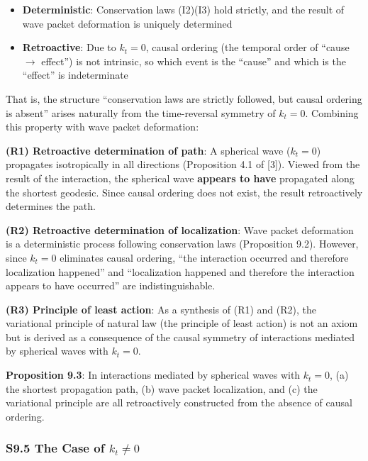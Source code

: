 \documentclass[
  a4paper,11pt]{article}
\providecommand{\tightlist}{%
  \setlength{\itemsep}{0pt}\setlength{\parskip}{0pt}}
\theoremstyle{definition}
\theoremstyle{remark}
\begin{document}
\begin{itemize}
\tightlist
\item
  \textbf{Deterministic}: Conservation laws (I2)(I3) hold strictly, and
  the result of wave packet deformation is uniquely determined
\item
  \textbf{Retroactive}: Due to \(k_t = 0\), causal ordering (the
  temporal order of ``cause \(\to\) effect'') is not intrinsic, so which
  event is the ``cause'' and which is the ``effect'' is indeterminate
\end{itemize}

That is, the structure ``conservation laws are strictly followed, but
causal ordering is absent'' arises naturally from the time-reversal
symmetry of \(k_t = 0\). Combining this property with wave packet
deformation:

\textbf{(R1) Retroactive determination of path}: A spherical wave
(\(k_t = 0\)) propagates isotropically in all directions (Proposition
4.1 of {[}3{]}). Viewed from the result of the interaction, the
spherical wave \textbf{appears to have} propagated along the shortest
geodesic. Since causal ordering does not exist, the result retroactively
determines the path.

\textbf{(R2) Retroactive determination of localization}: Wave packet
deformation is a deterministic process following conservation laws
(Proposition 9.2). However, since \(k_t = 0\) eliminates causal
ordering, ``the interaction occurred and therefore localization
happened'' and ``localization happened and therefore the interaction
appears to have occurred'' are indistinguishable.

\textbf{(R3) Principle of least action}: As a synthesis of (R1) and
(R2), the variational principle of natural law (the principle of least
action) is not an axiom but is derived as a consequence of the causal
symmetry of interactions mediated by spherical waves with \(k_t = 0\).

\textbf{Proposition 9.3}: In interactions mediated by spherical waves
with \(k_t = 0\), (a) the shortest propagation path, (b) wave packet
localization, and (c) the variational principle are all retroactively
constructed from the absence of causal ordering.

\subsubsection{\texorpdfstring{S9.5 The Case of
\(k_t \neq 0\)}{S9.5 The Case of k\_t \textbackslash neq 0}}\label{s9.5-the-case-of-k_t-neq-0}
\end{document}
